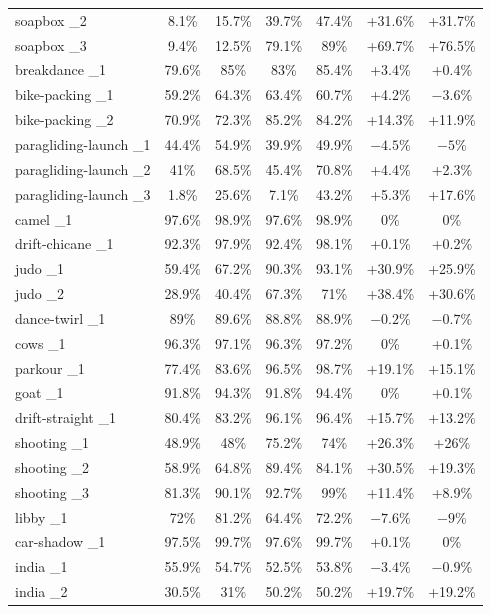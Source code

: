 \documentclass[journal,12pt,onecolumn,draftclsnofoot]{IEEEtran}
\begin{document}
\begin{longtable}{l c c c c c c}
soapbox \_2 & 8.1\% & 15.7\% & 39.7\% & 47.4\% & +31.6\% & +31.7\% \\
soapbox \_3 & 9.4\% & 12.5\% & 79.1\% & 89\% & +69.7\% & +76.5\% \\
breakdance \_1 & 79.6\% & 85\% & 83\% & 85.4\% & +3.4\% & +0.4\% \\
bike-packing \_1 & 59.2\% & 64.3\% & 63.4\% & 60.7\% & +4.2\% & $-3.6\%$ \\
bike-packing \_2 & 70.9\% & 72.3\% & 85.2\% & 84.2\% & +14.3\% & +11.9\% \\
paragliding-launch \_1 & 44.4\% & 54.9\% & 39.9\% & 49.9\% & $-4.5\%$ & $-5\%$ \\
paragliding-launch \_2 & 41\% & 68.5\% & 45.4\% & 70.8\% & +4.4\% & +2.3\% \\
paragliding-launch \_3 & 1.8\% & 25.6\% & 7.1\% & 43.2\% & +5.3\% & +17.6\% \\
camel \_1 & 97.6\% & 98.9\% & 97.6\% & 98.9\% & 0\% & 0\% \\
drift-chicane \_1 & 92.3\% & 97.9\% & 92.4\% & 98.1\% & +0.1\% & +0.2\% \\
judo \_1 & 59.4\% & 67.2\% & 90.3\% & 93.1\% & +30.9\% & +25.9\% \\
judo \_2 & 28.9\% & 40.4\% & 67.3\% & 71\% & +38.4\% & +30.6\% \\
dance-twirl \_1 & 89\% & 89.6\% & 88.8\% & 88.9\% & $-0.2\%$ & $-0.7\%$ \\
cows \_1 & 96.3\% & 97.1\% & 96.3\% & 97.2\% & 0\% & +0.1\% \\
parkour \_1 & 77.4\% & 83.6\% & 96.5\% & 98.7\% & +19.1\% & +15.1\% \\
goat \_1 & 91.8\% & 94.3\% & 91.8\% & 94.4\% & 0\% & +0.1\% \\
drift-straight \_1 & 80.4\% & 83.2\% & 96.1\% & 96.4\% & +15.7\% & +13.2\% \\
shooting \_1 & 48.9\% & 48\% & 75.2\% & 74\% & +26.3\% & +26\% \\
shooting \_2 & 58.9\% & 64.8\% & 89.4\% & 84.1\% & +30.5\% & +19.3\% \\
shooting \_3 & 81.3\% & 90.1\% & 92.7\% & 99\% & +11.4\% & +8.9\% \\
libby \_1 & 72\% & 81.2\% & 64.4\% & 72.2\% & $-7.6\%$ & $-9\%$ \\
car-shadow \_1 & 97.5\% & 99.7\% & 97.6\% & 99.7\% & +0.1\% & 0\% \\
india \_1 & 55.9\% & 54.7\% & 52.5\% & 53.8\% & $-3.4\%$ & $-0.9\%$ \\
india \_2 & 30.5\% & 31\% & 50.2\% & 50.2\% & +19.7\% & +19.2\% \\

\end{longtable}
\end{document}
